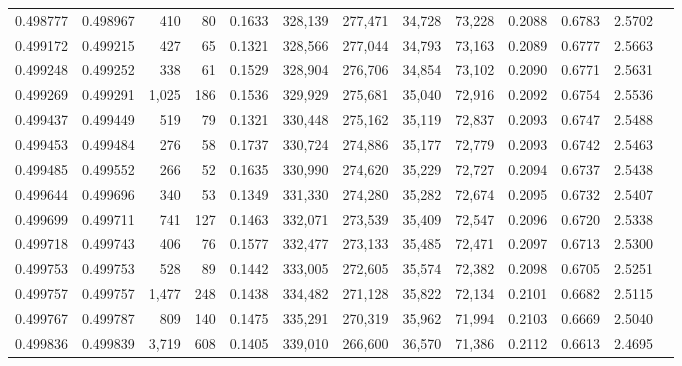 \begin{tabular}{rrrrrrrrrrrrr}
0.498777 & 0.498967 &   410 &    80 &                                     0.1633 & 328,139 & 277,471 &  34,728 &  73,228 & 0.2088 & 0.6783 & 2.5702 \\
0.499172 & 0.499215 &   427 &    65 &                                     0.1321 & 328,566 & 277,044 &  34,793 &  73,163 & 0.2089 & 0.6777 & 2.5663 \\
0.499248 & 0.499252 &   338 &    61 &                                     0.1529 & 328,904 & 276,706 &  34,854 &  73,102 & 0.2090 & 0.6771 & 2.5631 \\
0.499269 & 0.499291 & 1,025 &   186 &                                     0.1536 & 329,929 & 275,681 &  35,040 &  72,916 & 0.2092 & 0.6754 & 2.5536 \\
0.499437 & 0.499449 &   519 &    79 &                                     0.1321 & 330,448 & 275,162 &  35,119 &  72,837 & 0.2093 & 0.6747 & 2.5488 \\
0.499453 & 0.499484 &   276 &    58 &                                     0.1737 & 330,724 & 274,886 &  35,177 &  72,779 & 0.2093 & 0.6742 & 2.5463 \\
0.499485 & 0.499552 &   266 &    52 &                                     0.1635 & 330,990 & 274,620 &  35,229 &  72,727 & 0.2094 & 0.6737 & 2.5438 \\
0.499644 & 0.499696 &   340 &    53 &                                     0.1349 & 331,330 & 274,280 &  35,282 &  72,674 & 0.2095 & 0.6732 & 2.5407 \\
0.499699 & 0.499711 &   741 &   127 &                                     0.1463 & 332,071 & 273,539 &  35,409 &  72,547 & 0.2096 & 0.6720 & 2.5338 \\
0.499718 & 0.499743 &   406 &    76 &                                     0.1577 & 332,477 & 273,133 &  35,485 &  72,471 & 0.2097 & 0.6713 & 2.5300 \\
0.499753 & 0.499753 &   528 &    89 &                                     0.1442 & 333,005 & 272,605 &  35,574 &  72,382 & 0.2098 & 0.6705 & 2.5251 \\
0.499757 & 0.499757 & 1,477 &   248 &                                     0.1438 & 334,482 & 271,128 &  35,822 &  72,134 & 0.2101 & 0.6682 & 2.5115 \\
0.499767 & 0.499787 &   809 &   140 &                                     0.1475 & 335,291 & 270,319 &  35,962 &  71,994 & 0.2103 & 0.6669 & 2.5040 \\
0.499836 & 0.499839 & 3,719 &   608 &                                     0.1405 & 339,010 & 266,600 &  36,570 &  71,386 & 0.2112 & 0.6613 & 2.4695 \\

\end{tabular}
